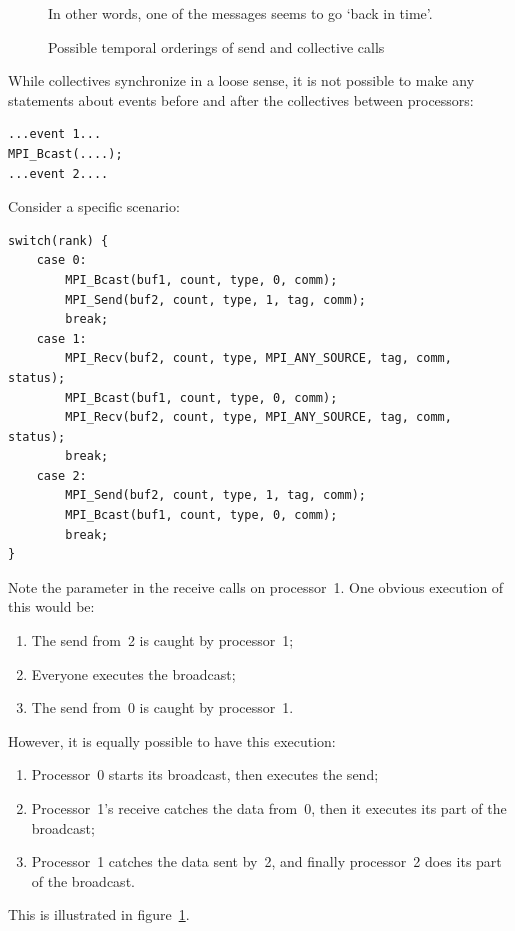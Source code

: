 \begin{figure}[p]
In other words, one of the messages seems to go `back in time'.

  \caption{Possible temporal orderings of send and collective calls}
  \label{fig:backintime}
\end{figure}

While collectives synchronize in a loose sense, it is not possible to
make any statements about events before and after the collectives
between processors:
\begin{lstlisting}
...event 1...
MPI_Bcast(....);
...event 2....
\end{lstlisting}
Consider a specific scenario:
\begin{lstlisting}
switch(rank) { 
    case 0: 
        MPI_Bcast(buf1, count, type, 0, comm); 
        MPI_Send(buf2, count, type, 1, tag, comm); 
        break; 
    case 1: 
        MPI_Recv(buf2, count, type, MPI_ANY_SOURCE, tag, comm, status); 
        MPI_Bcast(buf1, count, type, 0, comm); 
        MPI_Recv(buf2, count, type, MPI_ANY_SOURCE, tag, comm, status); 
        break; 
    case 2: 
        MPI_Send(buf2, count, type, 1, tag, comm); 
        MPI_Bcast(buf1, count, type, 0, comm); 
        break; 
}
\end{lstlisting}
Note the  parameter in the receive calls on processor~1.
One obvious execution of this would be:
\begin{enumerate}
\item The send from~2 is caught by processor~1;
\item Everyone executes the broadcast;
\item The send from~0 is caught by processor~1.
\end{enumerate}
However, it is equally possible to have this execution:
\begin{enumerate}
\item Processor~0 starts its broadcast, then executes the send;
\item Processor~1's receive catches the data from~0, then it executes
  its part of the broadcast;
\item Processor~1 catches the data sent by~2, and finally processor~2
  does its part of the broadcast.
\end{enumerate}

This is illustrated in figure~\ref{fig:backintime}.
